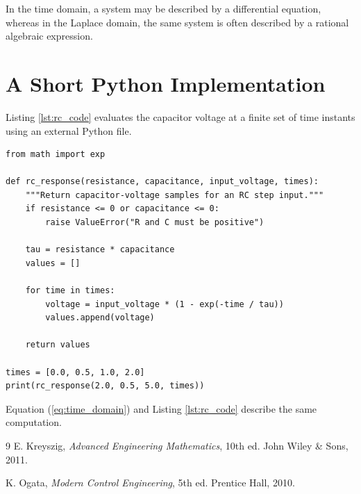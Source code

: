 \documentclass[11pt,a4paper]{article}
\begin{document}
In the time domain, a system may be described by a differential equation, whereas in the Laplace domain, the same system is often described by a rational algebraic expression.

\section{A Short Python Implementation}

Listing \ref{lst:rc_code} evaluates the capacitor voltage at a finite set of time instants using an external Python file.

\begin{lstlisting}[caption={Computing samples of the RC step response.}, label={lst:rc_code}]
from math import exp

def rc_response(resistance, capacitance, input_voltage, times):
    """Return capacitor-voltage samples for an RC step input."""
    if resistance <= 0 or capacitance <= 0:
        raise ValueError("R and C must be positive")
        
    tau = resistance * capacitance
    values = []
    
    for time in times:
        voltage = input_voltage * (1 - exp(-time / tau))
        values.append(voltage)
        
    return values

times = [0.0, 0.5, 1.0, 2.0]
print(rc_response(2.0, 0.5, 5.0, times))
\end{lstlisting}

Equation (\ref{eq:time_domain}) and Listing \ref{lst:rc_code} describe the same computation.

\begin{thebibliography}{9}
E. Kreyszig, \textit{Advanced Engineering Mathematics}, 10th ed. John Wiley \& Sons, 2011.

K. Ogata, \textit{Modern Control Engineering}, 5th ed. Prentice Hall, 2010.
\end{thebibliography}
\end{document}
